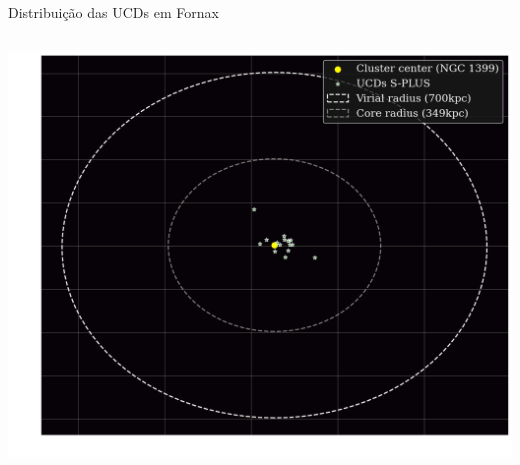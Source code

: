 \begin{frame}[c]{Distribuição das UCDs em Fornax}
\begin{columns}[c]
\begin{column}{0.48\textwidth}
            \vspace{0.5cm}
            \includegraphics[width=\textwidth, height=0.48\textheight, keepaspectratio]{images/distribuicao_ucds_center.png}
        \end{column}
    \end{columns}
\end{frame}

